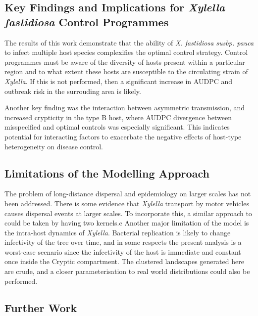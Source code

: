 \documentclass[11pt,letterpaper]{article}
\begin{document}
{\subsection*{Key Findings and Implications for \emph{Xylella fastidiosa} Control Programmes}

The results of this work demonstrate that the ability of \emph{X. fastidiosa susbp. pauca} to infect multiple host species complexifies the optimal control strategy. Control programmes must be aware of the diversity of hosts present within a particular region and to what extent these hosts are susceptible to the circulating strain of \emph{Xylella}. If this is not performed, then a significant increase in AUDPC and outbreak risk in the surrouding area is likely. 

Another key finding was the interaction between asymmetric transmission,  and increased crypticity in the type B host, where AUDPC divergence between misspecified and optimal controls was especially significant. This indicates potential for interacting factors to exacerbate the negative effects of host-type heterogeneity on disease control.

\subsection*{Limitations of the Modelling Approach}

The problem of long-distance dispersal and epidemiology on larger scales has not been addressed. There is some evidence that \emph{Xylella} transport by motor vehicles causes dispersal events at larger scales. To incorporate this, a similar approach to \cite{White2017} could be taken by having two kernels.c Another major limitation of the model is the intra-host dynamics of \emph{Xylella}. Bacterial replication is likely to change infectivity of the tree over time, and in some respects the present analysis is a worst-case scenario since the infectivity of the host is immediate and constant once inside the Cryptic compartment. The clustered landscapes generated here are crude, and a closer parameterisation to real world distributions could also be performed.

\subsection*{Further Work}

}
\end{document}
